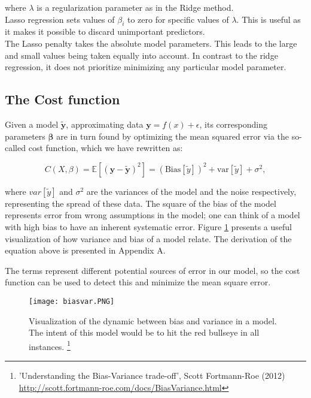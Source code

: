\documentclass[reprint,english,notitlepage]{revtex4-1}  %
\begin{document}
where $\lambda$ is a regularization parameter as in the Ridge method. \\


Lasso regression sets values of $\beta_i$ to zero for specific values of $\lambda$. This is useful as it makes it possible to discard unimportant predictors. \\




The Lasso penalty takes the absolute model parameters. This leads to the large and small values being taken equally into account. In contrast to the ridge regression, it does not prioritize minimizing any particular model parameter. 

\subsection{The Cost function}

Given a model $\tilde{\bm{y}}$, approximating data $\bm{y} = f(x) + \epsilon$, its corresponding parameters $\bm{\beta}$ are in turn found by optimizing the mean squared error via the so-called cost function, which we have rewritten as:

\[
C(X,\beta) = \mathbb{E}\left[(\bm{y}-\bm{\tilde{y}})^2\right]=(\mathrm{Bias}[\tilde{y}])^2+\mathrm{var}[\tilde{y}]+\sigma^2, 
\]

where $var[\tilde{y}]$ and $\sigma^2$ are the variances of the model and the noise respectively, representing the spread of these data. The square of the bias of the model represents error from wrong assumptions in the model; one can think of a model with high bias to have an inherent systematic error. Figure \ref{fig:bv1} presents a useful visualization of how variance and bias of a model relate. The derivation of the equation above is presented in Appendix A.

The terms represent different potential sources of error in our model, so the cost function can be used to detect this and minimize the mean square error.

\begin{figure}[h!]
    \centering
    \texttt{[image: biasvar.PNG]}
    \caption{Visualization of the dynamic between bias and variance in a model. The intent of this model would be to hit the red bullseye in all instances. \footnote{'Understanding the Bias-Variance trade-off', Scott Fortmann-Roe (2012) \url{http://scott.fortmann-roe.com/docs/BiasVariance.html}}}
    \label{fig:bv1}
\end{figure}
\end{document}
